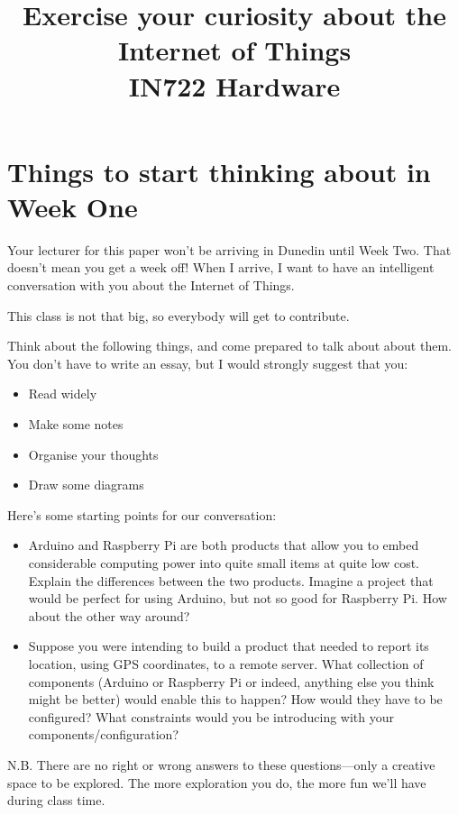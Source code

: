 \documentclass{article}
\begin{document}
\title{Exercise your curiosity about the Internet of Things\\ IN722 Hardware}
\date{}
\maketitle

\section*{Things to start thinking about in Week One}

Your lecturer for this paper won't be arriving in Dunedin until Week Two.
That doesn't mean you get a week off!   When I arrive, I want to have an
intelligent conversation with you about the Internet of Things.

This class is not that big, so everybody will get to contribute.

Think about the following things, and come prepared to talk about about them.  You don't
have to write an essay, but I would strongly  suggest that you:
\begin{itemize}
\item Read widely
\item Make some notes
\item Organise your thoughts
\item Draw some diagrams
\end{itemize}

Here's some starting points for our conversation:

\begin{itemize}
\item Arduino and Raspberry Pi are both products that allow you to embed considerable computing
power into quite small items at quite low cost.  Explain the differences between the two products.
Imagine a project that would be perfect for using Arduino, but not so good for Raspberry Pi.  How about the other way around?
\item Suppose you were intending to build a product that needed to report its location, using GPS
coordinates, to a remote server.  What collection of components (Arduino or Raspberry Pi
or indeed, anything else you think might be better) would enable this to happen?  How would they have to be configured?  What constraints would you be introducing with your components/configuration?
\end{itemize}

N.B. There are no right or wrong answers to these questions---only a creative space to be explored.
The more exploration you do, the more fun we'll have during class time.
\end{document}
